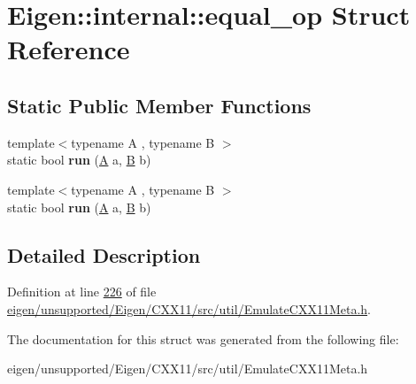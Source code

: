 \hypertarget{struct_eigen_1_1internal_1_1equal__op}{}\section{Eigen\+:\+:internal\+:\+:equal\+\_\+op Struct Reference}
\label{struct_eigen_1_1internal_1_1equal__op}
\subsection*{Static Public Member Functions}
\begin{DoxyCompactItemize}
\item 
\mbox{\label{struct_eigen_1_1internal_1_1equal__op_a086cd3bb088f90e58c189f24e557378d}} 
{\footnotesize template$<$typename A , typename B $>$ }\\static bool {\bfseries run} (\hyperlink{group___core___module_class_eigen_1_1_matrix}{A} a, \hyperlink{group___core___module_class_eigen_1_1_matrix}{B} b)
\item 
\mbox{\label{struct_eigen_1_1internal_1_1equal__op_a086cd3bb088f90e58c189f24e557378d}} 
{\footnotesize template$<$typename A , typename B $>$ }\\static bool {\bfseries run} (\hyperlink{group___core___module_class_eigen_1_1_matrix}{A} a, \hyperlink{group___core___module_class_eigen_1_1_matrix}{B} b)
\end{DoxyCompactItemize}


\subsection{Detailed Description}


Definition at line \hyperlink{eigen_2unsupported_2_eigen_2_c_x_x11_2src_2util_2_emulate_c_x_x11_meta_8h_source_l00226}{226} of file \hyperlink{eigen_2unsupported_2_eigen_2_c_x_x11_2src_2util_2_emulate_c_x_x11_meta_8h_source}{eigen/unsupported/\+Eigen/\+C\+X\+X11/src/util/\+Emulate\+C\+X\+X11\+Meta.\+h}.



The documentation for this struct was generated from the following file\+:\begin{DoxyCompactItemize}
\item 
eigen/unsupported/\+Eigen/\+C\+X\+X11/src/util/\+Emulate\+C\+X\+X11\+Meta.\+h\end{DoxyCompactItemize}
